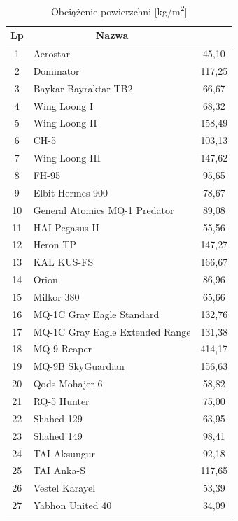 \documentclass[
    bindingoffset=5mm,
    footnoteindent=3mm,
    hyphenation=true    
]{src/wut-thesis}
\begin{document}
\begin{longtable}{| c | m{0,5\linewidth} | c |}
    \caption{Obciążenie powierzchni {[}kg/m\textsuperscript{2}{]}}
    \label{table:surface_load} \\
    \hline
    \textbf{Lp} & \multicolumn{1}{c|}{\textbf{Nazwa}} & \textbf{\begin{tabular}[c]{@{}c@{}}Obciążenie powierzchni {[}kg/m\textsuperscript{2}{]}\end{tabular}} \\ \hline \hline
    \endfirsthead
    
    \hline
    \endfoot
    
    1 & Aerostar & 45,10 \\ \hline
    2 & Dominator & 117,25 \\ \hline
    3 & Baykar Bayraktar TB2 & 66,67 \\ \hline
    4 & Wing Loong I & 68,32 \\ \hline
    5 & Wing Loong II & 158,49 \\ \hline
    6 & CH-5 & 103,13 \\ \hline
    7 & Wing Loong III & 147,62 \\ \hline
    8 & FH-95 & 95,65 \\ \hline
    9 & Elbit Hermes 900 & 78,67 \\ \hline
    10 & General Atomics MQ-1 Predator & 89,08 \\ \hline
    11 & HAI Pegasus II & 55,56 \\ \hline
    12 & Heron TP & 147,27 \\ \hline
    13 & KAL KUS-FS & 166,67 \\ \hline
    14 & Orion & 86,96 \\ \hline
    15 & Milkor 380 & 65,66 \\ \hline
    16 & MQ-1C Gray Eagle Standard & 132,76 \\ \hline
    17 & MQ-1C Gray Eagle Extended Range & 131,38 \\ \hline
    18 & MQ-9 Reaper & 414,17 \\ \hline
    19 & MQ-9B SkyGuardian & 156,63 \\ \hline
    20 & Qods Mohajer-6 & 58,82 \\ \hline
    21 & RQ-5 Hunter & 75,00 \\ \hline
    22 & Shahed 129 & 63,95 \\ \hline
    23 & Shahed 149 & 98,41 \\ \hline
    24 & TAI Aksungur & 92,18 \\ \hline
    25 & TAI Anka-S & 117,65 \\ \hline
    26 & Vestel Karayel & 53,39 \\ \hline
    27 & Yabhon United 40 & 34,09 \\ \hline
    
\end{longtable}
\end{document}
